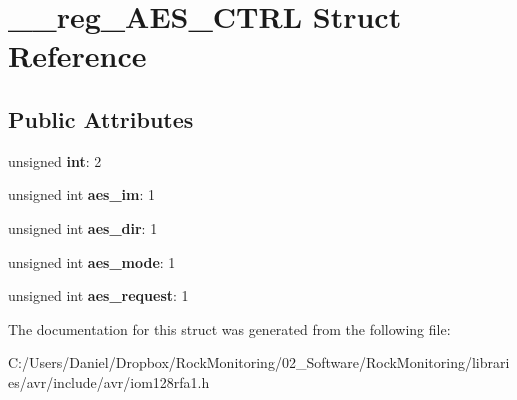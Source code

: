 \hypertarget{struct____reg___a_e_s___c_t_r_l}{}\section{\+\_\+\+\_\+reg\+\_\+\+A\+E\+S\+\_\+\+C\+T\+RL Struct Reference}
\label{struct____reg___a_e_s___c_t_r_l}
\subsection*{Public Attributes}
\begin{DoxyCompactItemize}
\item 
unsigned {\bfseries int}\+: 2\hypertarget{struct____reg___a_e_s___c_t_r_l_a1e572f61ad7226050b3b5002b3bbde72}{}\label{struct____reg___a_e_s___c_t_r_l_a1e572f61ad7226050b3b5002b3bbde72}

\item 
unsigned int {\bfseries aes\+\_\+im}\+: 1\hypertarget{struct____reg___a_e_s___c_t_r_l_a847fd86dd6c13c0be557fec67724c755}{}\label{struct____reg___a_e_s___c_t_r_l_a847fd86dd6c13c0be557fec67724c755}

\item 
unsigned int {\bfseries aes\+\_\+dir}\+: 1\hypertarget{struct____reg___a_e_s___c_t_r_l_a7ef07b26f62aa3fe33951faba6723094}{}\label{struct____reg___a_e_s___c_t_r_l_a7ef07b26f62aa3fe33951faba6723094}

\item 
unsigned int {\bfseries aes\+\_\+mode}\+: 1\hypertarget{struct____reg___a_e_s___c_t_r_l_a9328fad426442ab98460fc27d1ccfc3b}{}\label{struct____reg___a_e_s___c_t_r_l_a9328fad426442ab98460fc27d1ccfc3b}

\item 
unsigned int {\bfseries aes\+\_\+request}\+: 1\hypertarget{struct____reg___a_e_s___c_t_r_l_ade546a528933aec4cc340cd0458a46e0}{}\label{struct____reg___a_e_s___c_t_r_l_ade546a528933aec4cc340cd0458a46e0}

\end{DoxyCompactItemize}


The documentation for this struct was generated from the following file\+:\begin{DoxyCompactItemize}
\item 
C\+:/\+Users/\+Daniel/\+Dropbox/\+Rock\+Monitoring/02\+\_\+\+Software/\+Rock\+Monitoring/libraries/avr/include/avr/iom128rfa1.\+h\end{DoxyCompactItemize}
